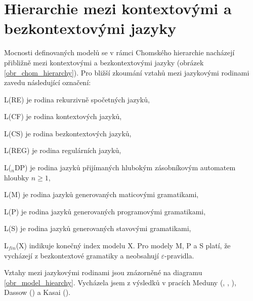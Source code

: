 \section{Hierarchie mezi kontextovými a bezkontextovými jazyky} \label{kap_teorie_hierarchie}


Mocnosti definovaných modelů se v rámci Chomského hierarchie nacházejí přibližně mezi kontextovými a bezkontextovými jazyky (obrázek \ref{obr_chom_hierarchy}). Pro bližší zkoumání vztahů mezi jazykovými rodinami zavedu následující označení:

\begin{description*}
\item{L(RE)} je rodina rekurzivně spočetných jazyků,
\item{L(CF)} je rodina kontextových jazyků,
\item{L(CS)} je rodina bezkontextových jazyků,
\item{L(REG)} je rodina regulárních jazyků,

\item{L(${}_n$DP)} je rodina jazyků přijímaných hlubokým zásobníkovým automatem hloubky $n \ge 1$,

\item{L(M)} je rodina jazyků generovaných maticovými gramatikami,
\item{L(P)} je rodina jazyků generovaných programovými gramatikami,
\item{L(S)} je rodina jazyků generovaných stavovými gramatikami,

\end{description*}

L${}_{fin}$(X) indikuje konečný index modelu X. Pro modely M, P a S platí, že vycházejí z bezkontextové gramatiky a neobsahují $\varepsilon$-pravidla.

Vztahy mezi jazykovými rodinami jsou znázorněné na diagramu \ref{obr_model_hiearchy}. Vycházela jsem z výsledků v pracích
Meduny (\cite{Meduna:DeepPDA}, \cite{Meduna:FinitelyDeepPDA}, \cite{Meduna:StateGrammars}), 
Dassow (\cite{Dassow:RegulatedRewriting}) a 
Kasai (\cite{Kasai:Hierarchy}).







